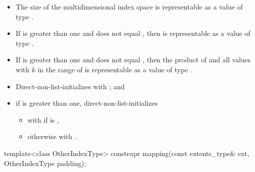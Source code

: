 \begin{itemdescr}
\pnum
\expects
\begin{itemize}
\item
The size of the multidimensional index space 
is representable as a value of type .
\item
If  is greater than one and
 does not equal ,
then 
is representable as a value of type .
\item
If  is greater than one and
 does not equal ,
then the product of
 and
all values 
with $k$ in the range of 
is representable as a value of type .
\end{itemize}

\pnum
\effects
\begin{itemize}
\item
Direct-non-list-initializes  with ; and
\item
if  is greater than one,
direct-non-list-initializes 
\begin{itemize}
\item
with 
if  is ,
\item
otherwise with
.
\end{itemize}
\end{itemize}
\end{itemdescr}

%
\begin{itemdecl}
template<class OtherIndexType>
  constexpr mapping(const extents_type& ext, OtherIndexType padding);
\end{itemdecl}

